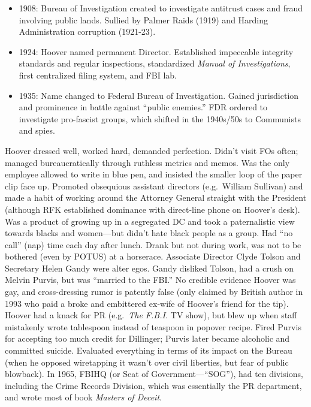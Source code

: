 \documentclass[
]{article}
\begin{document}
\begin{itemize}
\item
  1908: Bureau of Investigation created to investigate antitrust cases
  and fraud involving public lands. Sullied by Palmer Raids (1919) and
  Harding Administration corruption (1921-23).
\item
  1924: Hoover named permanent Director. Established impeccable
  integrity standards and regular inspections, standardized \emph{Manual
  of Investigations}, first centralized filing system, and FBI lab.
\item
  1935: Name changed to Federal Bureau of Investigation. Gained
  jurisdiction and prominence in battle against ``public enemies.'' FDR
  ordered to investigate pro-fascist groups, which shifted in the
  1940s/50s to Communists and spies.
\end{itemize}

Hoover dressed well, worked hard, demanded perfection. Didn't visit FOs
often; managed bureaucratically through ruthless metrics and memos. Was
the only employee allowed to write in blue pen, and insisted the smaller
loop of the paper clip face up. Promoted obsequious assistant directors
(e.g.~William Sullivan) and made a habit of working around the Attorney
General straight with the President (although RFK established dominance
with direct-line phone on Hoover's desk). Was a product of growing up in
a segregated DC and took a paternalistic view towards blacks and
women---but didn't hate black people as a group. Had ``no call'' (nap)
time each day after lunch. Drank but not during work, was not to be
bothered (even by POTUS) at a horserace. Associate Director Clyde Tolson
and Secretary Helen Gandy were alter egos. Gandy disliked Tolson, had a
crush on Melvin Purvis, but was ``married to the FBI.'' No credible
evidence Hoover was gay, and cross-dressing rumor is patently false
(only claimed by British author in 1993 who paid a broke and embittered
ex-wife of Hoover's friend for the tip). Hoover had a knack for PR
(e.g.~\emph{The F.B.I.} TV show), but blew up when staff mistakenly
wrote tablespoon instead of teaspoon in popover recipe. Fired Purvis for
accepting too much credit for Dillinger; Purvis later became alcoholic
and committed suicide. Evaluated everything in terms of its impact on
the Bureau (when he opposed wiretapping it wasn't over civil liberties,
but fear of public blowback). In 1965, FBIHQ (or Seat of
Government---``SOG''), had ten divisions, including the Crime Records
Division, which was essentially the PR department, and wrote most of
book \emph{Masters of Deceit}.
\end{document}

